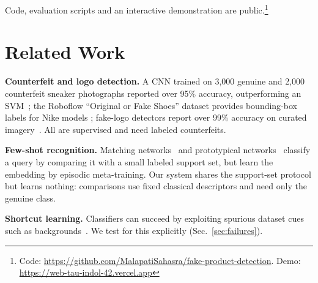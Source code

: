 \documentclass[conference]{IEEEtran}
\begin{document}
Code, evaluation scripts and an interactive demonstration are
public.\footnote{Code: \url{https://github.com/MalapatiSahasra/fake-product-detection}. Demo: \url{https://web-tau-indol-42.vercel.app}}

\section{Related Work}
\label{sec:related}

\textbf{Counterfeit and logo detection.} A CNN trained on 3{,}000 genuine
and 2{,}000 counterfeit sneaker photographs reported over 95\% accuracy,
outperforming an SVM~\cite{footwear2024}; the Roboflow ``Original or Fake
Shoes'' dataset provides bounding-box labels for Nike models
\cite{roboflow2024}; fake-logo detectors report over 99\% accuracy on
curated imagery~\cite{fakelogo2024}. All are supervised and need labeled
counterfeits.

\textbf{Few-shot recognition.} Matching networks~\cite{vinyals2016} and
prototypical networks~\cite{snell2017} classify a query by comparing it
with a small labeled support set, but learn the embedding by episodic
meta-training. Our system shares the support-set protocol but learns
nothing: comparisons use fixed classical descriptors
\cite{orb2011,lowe2004,opencv} and need only the genuine class.

\textbf{Shortcut learning.} Classifiers can succeed by exploiting
spurious dataset cues such as backgrounds~\cite{geirhos2020}. We test for
this explicitly (Sec.~\ref{sec:failures}).

\begin{table}[t]
\caption{Positioning Against Related Work}
\label{tab:related}
\centering
{}
\end{table}
\end{document}
